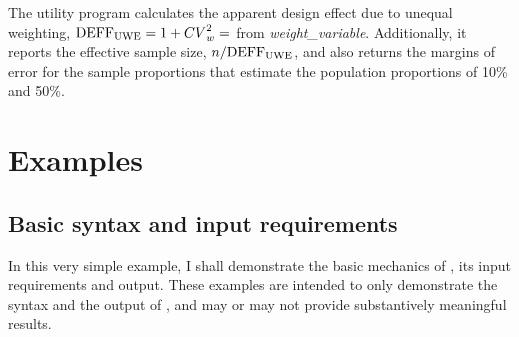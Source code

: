 The utility program  calculates the apparent design effect due to unequal weighting,
${\rm DEFF_{UWE}}=1 + {CV}^2_w = $  from  {\it weight\_variable}.
Additionally, it reports the effective sample size, $n/{\rm DEFF_{UWE}}$, and also returns
the margins of error for the sample proportions that estimate the population proportions of 
10\% and 50\%.

\begin{stlog}
\nullskip
\end{stlog}



\section{Examples}
\label{sec:examples}

\subsection{Basic syntax and input requirements}
\label{subsec:basic}

In this very simple example, I shall demonstrate the basic mechanics of
, its input requirements and output.
These examples are intended to only demonstrate the syntax
and the output of , and may or may not provide
substantively meaningful results.


